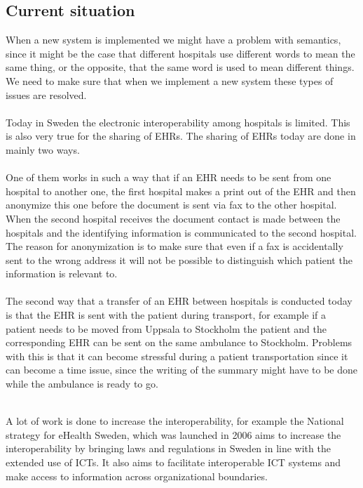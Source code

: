 \documentclass[14pt]{article}
\begin{document}
\subsection{Current situation} %
When a new system is implemented we might have a problem with semantics, since it might be the case that different hospitals use different words to mean the same thing, or the opposite, that the same word is used to mean different things. We need to make sure that when we implement a new system these types of issues are resolved.~\cite{Empirica}
\\\\
Today in Sweden the electronic \gls{interoperability} among hospitals is limited. This is also very true for the sharing of \glspl{EHR}. The sharing of \glspl{EHR} today are done in mainly two ways.
\\\\
One of them works in such a way that if an \gls{EHR} needs to be sent from one hospital to another one, the first hospital makes a print out of the \gls{EHR} and then anonymize this one before the document is sent via fax to the other hospital. When the second hospital receives the document contact is made between the hospitals and the identifying information is communicated to the second hospital.\cite{EPJ2} The reason for anonymization is to make sure that even if a fax is accidentally sent to the wrong address it will not be possible to distinguish which patient the information is relevant to.
\\\\
The second way that a transfer of an \gls{EHR} between hospitals is conducted today is that the \gls{EHR} is sent with the patient during transport, for example if a patient needs to be moved from Uppsala to Stockholm the patient and the corresponding \gls{EHR} can be sent on the same ambulance to Stockholm\cite{EPJ2}. Problems with this is that it can become stressful during a patient transportation since it can become a time issue, since the writing of the summary might have to be done while the ambulance is ready to go\cite{EPJ2}.
\\\\


A lot of work is done to increase the \gls{interoperability}, for example the National strategy for eHealth Sweden, which was launched in 2006 aims to increase the interoperability by bringing laws and regulations in Sweden in line with the extended use of \glspl{ICT}. It also aims to facilitate interoperable \gls{ICT} systems and make access to information across organizational boundaries\cite{NationalStrategy}. 
\end{document}
